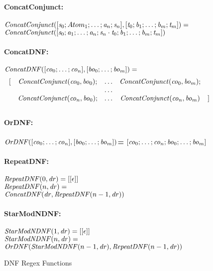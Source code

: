 \begin{figure}
\bf{ConcatConjunct}:\\
\ConcatConjunct \OfType {}\\
$\mathit{ConcatConjunct}([\mathit{s}_0;Atom_1;\ldots;\mathit{a}_n;\mathit{s}_n],[\mathit{t}_0;\mathit{b}_1;\ldots;\mathit{b}_m;\mathit{t}_m])=$\\
\hspace*{2ex}$\mathit{ConcatConjunct}([\mathit{s}_0;\mathit{a}_1;\ldots;\mathit{a}_n;\mathit{s}_n\cdot\mathit{t}_0;\mathit{b}_1;\ldots;\mathit{b}_m;\mathit{t}_m])$\\
\\
\bf{ConcatDNF}:\\
\ConcatDNF \OfType {}\\
$\mathit{ConcatDNF}([\mathit{co}_0;\ldots;\mathit{co}_n],[\mathit{bo}_0;\ldots;\mathit{bo}_m])=$
\[
\begin{array}{rcccl}
[ & \mathit{ConcatConjunct}(\mathit{co}_0,\mathit{bo}_0); & \ldots & \mathit{ConcatConjunct}(\mathit{co}_0,\mathit{bo}_m); \\
& & \ldots & \\
& \mathit{ConcatConjunct}(\mathit{co}_n,\mathit{bo}_0); & \ldots & \mathit{ConcatConjunct}(\mathit{co}_n,\mathit{bo}_m) & ]
\end{array}
\]
\\
\bf{OrDNF}:\\
\OrDNF \OfType {}\\
$\mathit{OrDNF}([\mathit{co}_0;\ldots;\mathit{co}_n],[\mathit{bo}_0;\ldots;\mathit{bo}_m])$=
\hspace*{2ex}$[\mathit{co}_0;\ldots;\mathit{co}_n;\mathit{bo}_0;\ldots;\mathit{bo}_m]$\\
\\
\bf{RepeatDNF}:\\
\RepeatDNF \OfType {}\\
$\mathit{RepeatDNF}(0,\mathit{dr})=[[\epsilon]]$\\
$\mathit{RepeatDNF}(n,\mathit{dr})=$\\
\hspace*{2ex}$\mathit{ConcatDNF}(\mathit{dr},\mathit{RepeatDNF}(n-1,\mathit{dr}))$\\
\\
\bf{StarModNDNF}:\\
\StarModNDNF \OfType {}\\
$\mathit{StarModNDNF}(1,\mathit{dr})=[[\epsilon]]$\\
$\mathit{StarModNDNF}(n,\mathit{dr})=$\\
\hspace*{2ex}$\mathit{OrDNF}(\mathit{StarModNDNF}(n-1,\mathit{dr}),\mathit{RepeatDNF}(n-1,\mathit{dr}))$

\caption{DNF Regex Functions}
\label{fig:dnf-regex-functions}
\end{figure}
